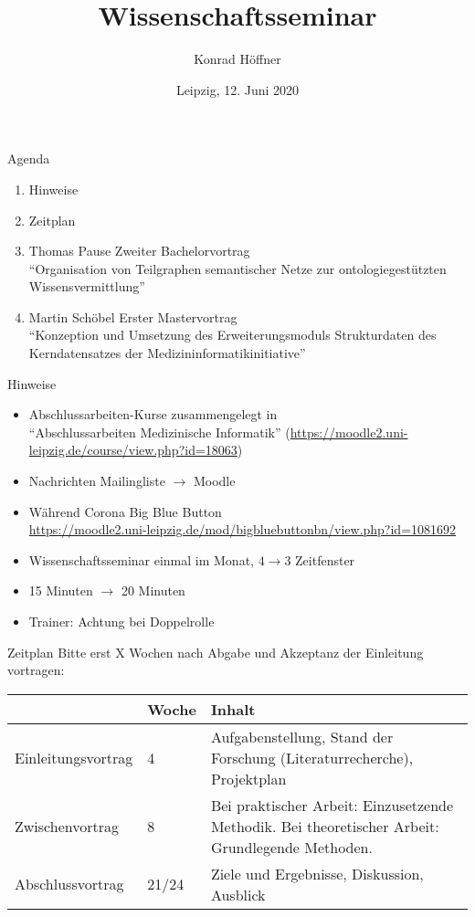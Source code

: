\documentclass[aspectratio=169]{beamer}
\author{Konrad Höffner}
\date{Leipzig, 12. Juni 2020}
\title{Wissenschaftsseminar}
\subtitle{}
\begin{document}
\begin{frame}
\titlepage
\end{frame}

\begin{frame}{Agenda}
\begin{enumerate}
\item Hinweise 
\item Zeitplan
\item Thomas Pause Zweiter Bachelorvortrag\\\enquote{Organisation von Teilgraphen semantischer Netze zur ontologiegestützten Wissensvermittlung}
\item Martin Schöbel Erster Mastervortrag\\\enquote{Konzeption und Umsetzung des Erweiterungsmoduls Strukturdaten des Kerndatensatzes der Medizininformatikinitiative}
\end{enumerate}
\end{frame}

\begin{frame}{Hinweise}
\begin{itemize}
\item Abschlussarbeiten-Kurse zusammengelegt in \\ \enquote{Abschlussarbeiten Medizinische Informatik} (\url{https://moodle2.uni-leipzig.de/course/view.php?id=18063})
\item Nachrichten Mailingliste $\rightarrow$ Moodle
\item Während Corona Big Blue Button\\\url{https://moodle2.uni-leipzig.de/mod/bigbluebuttonbn/view.php?id=1081692}
\item Wissenschaftsseminar einmal im Monat, $4 \rightarrow 3$ Zeitfenster
\item 15 Minuten $\rightarrow$ 20 Minuten 
\item Trainer: Achtung bei Doppelrolle
\end{itemize}
\end{frame}

\begin{frame}{Zeitplan}
Bitte erst X Wochen nach Abgabe und Akzeptanz der Einleitung vortragen:
\begin{tabulary}{\textwidth}{llL}
\toprule
                   & Woche & Inhalt                                                                                           \\
\midrule
Einleitungsvortrag & 4                              & Aufgabenstellung, Stand der Forschung (Literaturrecherche), Projektplan                          \\
Zwischenvortrag    & 8                              & Bei praktischer Arbeit: Einzusetzende Methodik. Bei theoretischer Arbeit: Grundlegende Methoden. \\
Abschlussvortrag   & 21/24     & Ziele und Ergebnisse, Diskussion, Ausblick\\
\bottomrule
\end{tabulary}
\end{frame}

\end{document}

